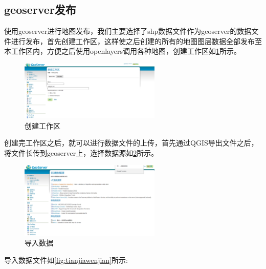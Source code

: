 \subsection{geoserver发布}
使用geoserver进行地图发布，我们主要选择了shp数据文件作为geoserver的数据文件进行发布，首先创建工作区，这样使之后创建的所有的地图图层数据全部发布至本工作区内，方便之后使用openlayers调用各种地图，创建工作区如\ref{fig:gongzuoqu}所示。
\begin{figure}[!htb]%
	\centering
	\includegraphics[width=0.60\textwidth]{figs/创建工作区.png}
	\caption{创建工作区}
	\label{fig:gongzuoqu}
\end{figure}
创建完工作区之后，就可以进行数据文件的上传，首先通过QGIS导出文件之后，将文件长传到geoserver上，选择数据源如\ref{fig:xinjianshuju}所示。
\begin{figure}[!htb]%
	\centering
	\includegraphics[width=0.60\textwidth]{figs/新建数据.png}
	\caption{导入数据}
	\label{fig:xinjianshuju}
\end{figure}

导入数据文件如\ref{fig:tianjiawenjian}所示:

